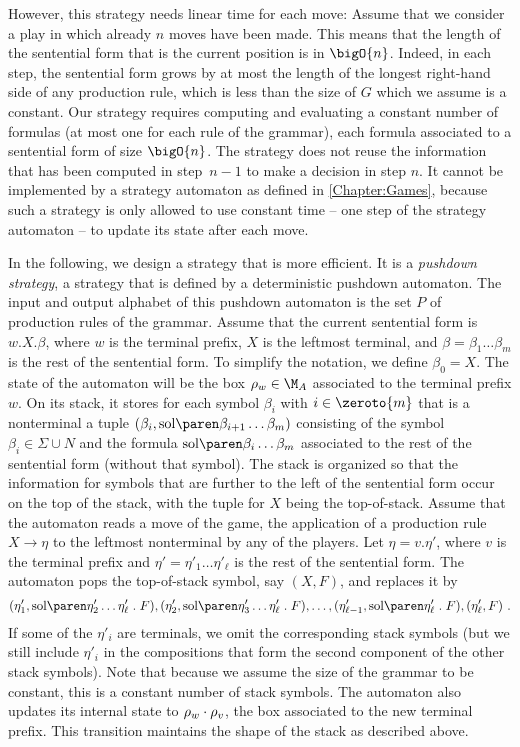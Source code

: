 \documentclass[../../diss.tex]{subfiles}
\begin{document}
However, this strategy needs linear time for each move:
Assume that we consider a play in which already $n$ moves have been made.
This means that the length of the sentential form that is the current position is in $\bigO{n}$.
Indeed, in each step, the sentential form grows by at most the length of the longest right-hand side of any production rule, which is less than the size of $G$ which we assume is a constant.
Our strategy requires computing and evaluating a constant number of formulas (at most one for each rule of the grammar), each formula associated to a sentential form of size $\bigO{n}$.
The strategy does not reuse the information that has been computed in step~$n-1$ to make a decision in step $n$.
It cannot be implemented by a strategy automaton as defined in \cref{Chapter:Games}, because such a strategy is only allowed to use constant time -- one step of the strategy automaton -- to update its state after each move.

In the following, we design a strategy that is more efficient.
It is a \emph{pushdown strategy}, a strategy that is defined by a deterministic pushdown automaton.
The input and output alphabet of this pushdown automaton is the set $P$ of production rules of the grammar.
Assume that the current sentential form is $w.X.\beta$, where $w$ is the terminal prefix, $X$ is the leftmost terminal, and $\beta = \beta_1 \ldots \beta_m$ is the rest of the sentential form.
To simplify the notation, we define $\beta_0 = X $.
The state of the automaton will be the box $\tbox{w} \in \nfatransmonoid{A}$ associated to the terminal prefix $w$.
On its stack, it stores for each symbol $\beta_i$ with $i \in \zeroto{m}$ that is a nonterminal a tuple $(\beta_i, \sol{\beta_{i+1} \ldots \beta_m})$ consisting of the symbol $\beta_i \in \Sigma \cup N$ and the formula $\sol{\beta_i \ldots \beta_m}$ associated to the rest of the sentential form (without that symbol).
The stack is organized so that the information for symbols that are further to the left of the sentential form occur on the top of the stack, with the tuple for $X$ being the top-of-stack.
%
Assume that the automaton reads a move of the game, \ie the application of a production rule $X \to \eta$ to the leftmost nonterminal by any of the players.
Let $\eta = v.\eta'$, where $v$ is the terminal prefix and $\eta' = \eta'_1 \ldots \eta'_\ell$ is the rest of the sentential form.
The automaton pops the top-of-stack symbol, say $(X, F)$, and replaces it by
\[
    (\eta'_1, \sol{\eta'_2 \ldots \eta'_\ell} \comp F),
    (\eta'_2, \sol{\eta'_3 \ldots \eta'_\ell} \comp F),
    \ldots,
    (\eta'_{\ell - 1}, \sol{ \eta'_\ell} \comp F),
    (\eta'_\ell, F)
    \ .
\]
If some of the $\eta'_i$ are terminals, we omit the corresponding stack symbols (but we still include $\eta'_i$ in the compositions that form the second component of the other stack symbols).
Note that because we assume the size of the grammar to be constant, this is a constant number of stack symbols.
The automaton also updates its internal state to $\tbox{w} \relcomp \tbox{v}$, \ie the box associated to the new terminal prefix.
This transition maintains the shape of the stack as described above.
\end{document}
